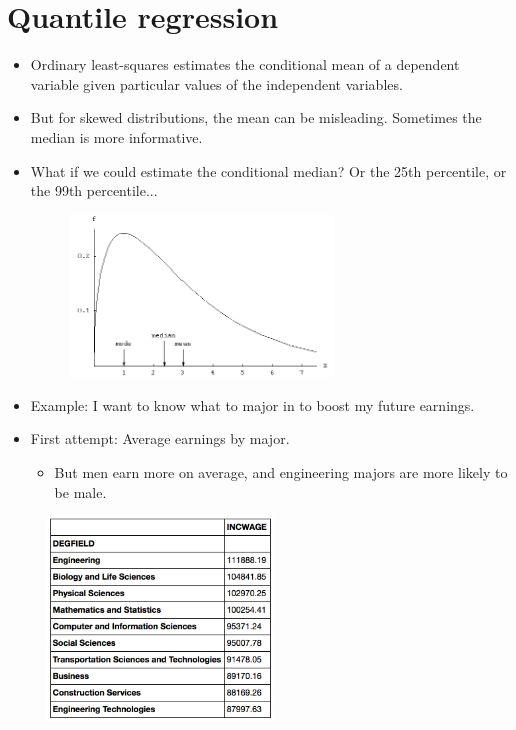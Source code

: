 \documentclass{beamer}
\begin{document}
\section{Quantile regression}

\begin{frame}
	\begin{itemize}
		\item Ordinary least-squares estimates the conditional mean of a dependent variable given particular values of the independent variables.
		\item But for skewed distributions, the mean can be misleading. Sometimes the median is more informative.
		\item What if we could estimate the conditional median? Or the 25th percentile, or the 99th percentile...
		\begin{figure}
			\includegraphics[width=7cm]{skewed-distribution.png}
			\centering
		\end{figure}
	\end{itemize}
\end{frame}

\begin{frame}
	\begin{itemize}
		\item Example: I want to know what to major in to boost my future earnings.
		\item First attempt: Average earnings by major.
			\begin{itemize}
				\item But men earn more on average, and engineering majors are more likely to be male.
			\end{itemize}
	\end{itemize}
	\begin{figure}
		\includegraphics[width=6cm]{chinoy-majors-1.png}
		\centering
	\end{figure}
\end{frame}
\end{document}
